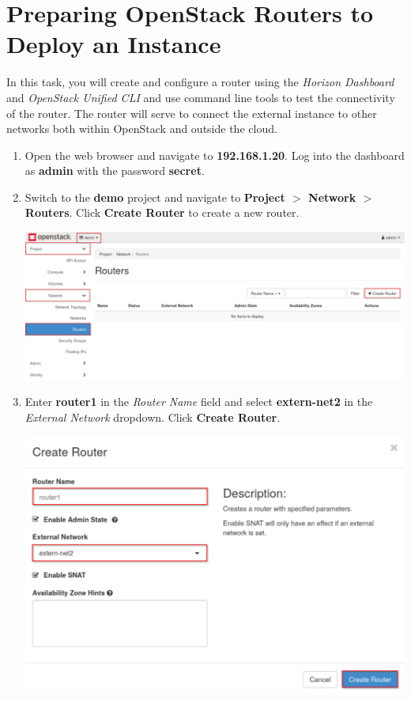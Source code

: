 \documentclass[letterpaper, 12pt]{article}
\begin{document}
\section{Preparing OpenStack Routers to Deploy an Instance}
\label{sec:preparing_openstack_routers_to_deploy_an_instance}
In this task, you will create and configure a router using the \textit{Horizon Dashboard} and \textit{OpenStack Unified
CLI} and use command line tools to test the connectivity of the router. The router will serve to connect the external
instance to other networks both within OpenStack and outside the cloud.

\begin{enumerate}
    \item Open the web browser and navigate to \textbf{192.168.1.20}. Log into the dashboard as \textbf{admin} with the
    password \textbf{secret}.

    \item Switch to the \textbf{demo} project and navigate to \textbf{Project $>$ Network $>$ Routers}. Click
    \textbf{Create Router} to create a new router.
    
    \begin{center}
        \includegraphics[width=\linewidth]{images/part2/step2.png}
    \end{center}

    \item Enter \textbf{router1} in the \textit{Router Name} field and select \textbf{extern-net2} in the
    \textit{External Network} dropdown. Click \textbf{Create Router}.

    \begin{center}
        \includegraphics[width=\linewidth]{images/part2/step3.png}
    \end{center}


\end{enumerate}
\end{document}
